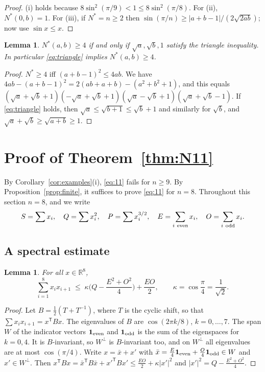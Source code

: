 \documentclass[11pt]{article}
\newtheorem{lemma}[theorem]{Lemma}
\theoremstyle{remark}
\numberwithin{equation}{section}
\newcommand{\R}{\mathbb{R}}
\begin{document}
\begin{proof}
(i) holds because $8\sin^2(\pi/9)<1\le8\sin^2(\pi/8)$. For (ii), $N^*(0,b)=1$. For (iii), if
$N^*=n\ge2$ then $\sin(\pi/n)\ge|a+b-1|/(2\sqrt{2ab})$; now use $\sin x\le x$.
\end{proof}

\begin{lemma}\label{lem:sqrt-triangle}
$N^*(a,b)\ge4$ if and only if $\sqrt a,\sqrt b,1$ satisfy the triangle inequality. In
particular \eqref{eq:triangle} implies $N^*(a,b)\ge4$.
\end{lemma}

\begin{proof}
$N^*\ge4$ iff $(a+b-1)^2\le 4ab$. We have
$4ab-(a+b-1)^2=2(ab+a+b)-(a^2+b^2+1)$, and this equals
$(\sqrt a+\sqrt b+1)(-\sqrt a+\sqrt b+1)(\sqrt a-\sqrt b+1)(\sqrt a+\sqrt b-1)$. If
\eqref{eq:triangle} holds, then $\sqrt a\le\sqrt{b+1}\le\sqrt b+1$ and similarly for $\sqrt b$,
and $\sqrt a+\sqrt b\ge\sqrt{a+b}\ge1$.
\end{proof}

\section{Proof of Theorem~\ref{thm:N11}}\label{sec:n8}

By Corollary~\ref{cor:examples}(i), \eqref{eq:11} fails for $n\ge9$. By
Proposition~\ref{prop:finite}, it suffices to prove \eqref{eq:11} for $n=8$. Throughout this
section $n=8$, and we write
\[
S=\sum x_i,\quad Q=\sum x_i^2,\quad P=\sum x_i^{3/2},\quad
E=\sum_{i\ \rm even}x_i,\quad O=\sum_{i\ \rm odd}x_i .
\]

\subsection{A spectral estimate}

\begin{lemma}\label{lem:spectral}
For all $x\in\R^8$,
\[
\sum_{i=1}^8x_ix_{i+1}\;\le\;\kappa\Big(Q-\frac{E^2+O^2}{4}\Big)+\frac{EO}{2},\qquad \kappa=\cos\frac\pi4=\frac{1}{\sqrt2}.
\]
\end{lemma}

\begin{proof}
Let $B=\frac12(T+T^{-1})$, where $T$ is the cyclic shift, so that $\sum x_ix_{i+1}=x^{\mathsf T}Bx$.
The eigenvalues of $B$ are $\cos(2\pi k/8)$, $k=0,\dots,7$. The span $W$ of the indicator
vectors $\mathbf 1_{\rm even}$ and $\mathbf 1_{\rm odd}$ is the sum of the eigenspaces for
$k=0,4$. It is $B$-invariant, so $W^\perp$ is $B$-invariant too, and on $W^\perp$ all
eigenvalues are at most $\cos(\pi/4)$. Write $x=\bar x+x'$ with
$\bar x=\frac E4\mathbf 1_{\rm even}+\frac O4\mathbf 1_{\rm odd}\in W$ and $x'\in W^\perp$. Then
$x^{\mathsf T}Bx=\bar x^{\mathsf T}B\bar x+x'^{\mathsf T}Bx'\le\frac{EO}2+\kappa|x'|^2$ and
$|x'|^2=Q-\frac{E^2+O^2}4$.
\end{proof}
\end{document}
